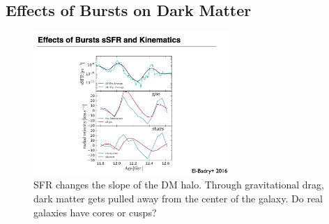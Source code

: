\documentclass{article}
\begin{document}
\subsection{Effects of Bursts on Dark Matter}

\begin{figure}
    \centering
    \includegraphics[width=0.66\textwidth]{figs/Screen Shot 2021-11-19 at 10.56.56 AM.png}
    \caption{SFR changes the slope of the DM halo. Through gravitational drag, dark matter gets pulled away from the center of the galaxy. Do real galaxies have cores or cusps?}
    \label{fig:my_label}
\end{figure}



\end{document}
